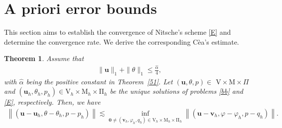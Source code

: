 \documentclass[10pt,a4paper]{article}
\newtheorem{theorem} {\bf Theorem}
\begin{document}
  		\section{A priori error bounds}\label{section4}
  		This section aims to establish the convergence of Nitsche's scheme \eqref{E} and determine the convergence rate. We derive the corresponding C\`{e}a's estimate. 
  		\begin{theorem}\label{RR1}
  			Assume that
  			\begin{align}\label{57}
  			\| \boldsymbol{u} \|_{1}    + \| \theta \|_{1} \leq \frac{\hat{\alpha}}{4},
  			\end{align}
  			with $\hat{\alpha}$ being the positive constant in Theorem~\ref{51}. Let $(\boldsymbol{u},\theta, p) \in$ $\mathrm{V} \times \mathrm{M} \times \Pi$ and $\left(\boldsymbol{u}_h,\theta_h,p_h \right) \in \mathrm{V}_h \times \mathrm{M}_h \times\mathrm{\Pi}_h$ be the unique solutions of problems \eqref{bb} and \eqref{E}, respectively. Then, we have 
  			\begin{align}\label{58}
  			\left\|\left( \boldsymbol{u}-\boldsymbol{u}_h, \theta - \theta_h, p - p_h \right)\right\| \lesssim  \inf _{\boldsymbol{0} \neq  \left(\boldsymbol{v}_h,\varphi_h,q_h \right) \in \mathrm{V}_h \times \mathrm{M}_h \times  \mathrm{\Pi}_h}\left\|\left(\boldsymbol{u}-\boldsymbol{v}_h, \varphi - \varphi_h, p-q_h \right)\right\|.
  			\end{align}	
  		\end{theorem} 
\end{document}
